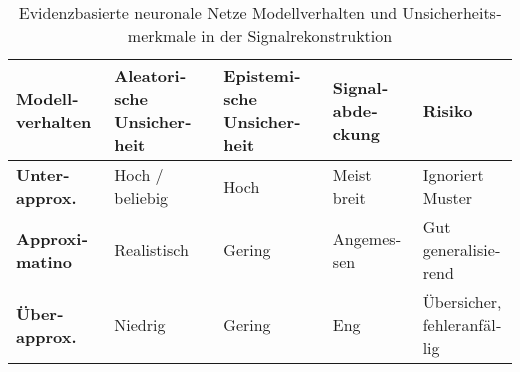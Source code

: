 \begin{otherlanguage}{ngerman}
\begin{table}[h!]
\centering
\begin{tabular}{@{}lllll@{}}
\toprule
\textbf{Modellverhalten} & \textbf{\gls{Aleatorische Unsicherheit}} & \textbf{\gls{Epistemische Unsicherheit}} & \textbf{Signalabdeckung} & \textbf{Risiko} \\
\midrule
\textbf{Unterapprox.} & Hoch / beliebig & Hoch    & Meist breit   & Ignoriert Muster \\
\textbf{Approximatino}      & Realistisch     & Gering  & Angemessen    & Gut generalisierend \\
\textbf{Überapprox.}  & Niedrig         & Gering  & Eng           & Übersicher, fehleranfällig \\
\bottomrule
\end{tabular}
\caption{\gls{Evidenzbasierte neuronale Netze} Modellverhalten und Unsicherheitsmerkmale in der Signalrekonstruktion}
\end{table}











\end{otherlanguage}
